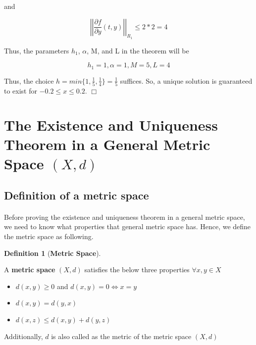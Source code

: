 \documentclass{article}
\theoremstyle{definition}
\newtheorem{definition}{Definition}[section]
\theoremstyle{remark}
\theoremstyle{example}
\newcommand{\qedwhite}{\hfill \ensuremath{\Box}}
\begin{document}
and

\begin{equation}
    \left\lvert\left\lvert \frac{\partial f}{\partial y} (t,y) \right\rvert\right\rvert_{R_1} \leq 2*2 = 4
\end{equation}

Thus, the parameters $h_1$, $\alpha$, M, and L in the theorem will be

\begin{equation}
    h_1 = 1, \alpha = 1, M = 5, L = 4
\end{equation}

Thus, the choice $h = min\{ 1, \tfrac{1}{5}, \tfrac{1}{4} \} = \tfrac{1}{5}$ suffices. So, a unique solution is guaranteed to exist for $-0.2 \leq x \leq 0.2$. \qedwhite

\section{The Existence and Uniqueness Theorem in a General Metric Space $(X,d)$}

\subsection{Definition of a metric space}

\paragraph{  }
Before proving the existence and uniqueness theorem in a general metric space, we need to know what properties that general metric space has. Hence, we define the metric space as following.

\begin{definition}[\textbf{Metric Space}]\label{def:matricSpace}

A \textbf{metric space} $(X,d)$ satisfies the below three properties $\forall x,y \in X$ 

\begin{itemize}
    \item $d(x,y) \geq 0$ and $d(x,y) = 0 \Longleftrightarrow x = y$
    \item $d(x,y) = d(y,x)$
    \item $d(x,z) \leq d(x,y) + d(y,z)$
\end{itemize}

Additionally, $d$ is also called as the metric of the metric space $(X,d)$
\end{definition}
\end{document}
